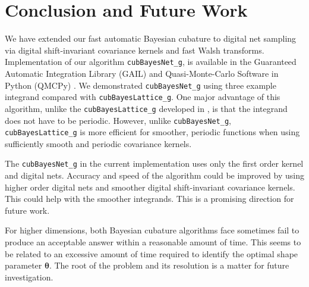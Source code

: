 \documentclass[graybox,footinfo]{svmult}
\newcommand{\FJHNote}[1]{{\textcolor{blue}{FJH: #1}}}
\begin{document}







\section{Conclusion and Future Work}
\label{FJ:sec:conclusion-future-work}

We have extended our fast automatic Bayesian cubature to digital net sampling via digital shift-invariant covariance kernels and fast Walsh transforms.  Implementation of our algorithm \texttt{cubBayesNet\_g}, is available in the Guaranteed Automatic Integration Library (GAIL) \cite{ChoEtal21a} and Quasi-Monte-Carlo Software in Python (QMCPy) \cite{QMCPy2020a}.  We demonstrated \texttt{cubBayesNet\_g} using three example integrand compared with \texttt{cubBayesLattice\_g}. 
One major advantage of this algorithm, unlike the \texttt{cubBayesLattice\_g} developed in \cite{RatHic19a}, is that the integrand does not have to be periodic.  However, unlike \texttt{cubBayesNet\_g}, \texttt{cubBayesLattice\_g} is more efficient for smoother, periodic functions when using sufficiently smooth and periodic covariance kernels.

The \texttt{cubBayesNet\_g} in the current implementation uses only the first order kernel and digital nets. Accuracy and speed of the algorithm could be improved by using higher order digital nets and smoother digital shift-invariant covariance kernels. This could help with the smoother integrands. This is a promising direction for future work.

For higher dimensions, both Bayesian cubature algorithms face sometimes fail to produce an acceptable answer within a reasonable amount of time.  This seems to be related to an excessive amount of time required to identify the optimal shape parameter $\boldsymbol{\theta}$.  The root of the problem and its resolution is a matter for future investigation.




% 


\end{document}
